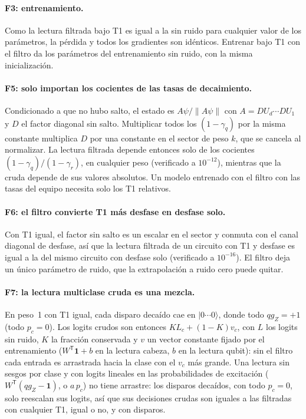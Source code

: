 \documentclass[11pt]{article}
\newcommand{\qZ}{qg_Z}
\begin{document}
\paragraph{F3: entrenamiento.} Como la lectura filtrada bajo T1 es igual a la sin ruido para cualquier valor de
los parámetros, la pérdida y todos los gradientes son idénticos. Entrenar bajo T1 con el filtro da los
parámetros del entrenamiento sin ruido, con la misma inicialización.

\paragraph{F5: solo importan los cocientes de las tasas de decaimiento.} Condicionado a que no hubo salto, el estado
es $A\psi/\|A\psi\|$ con $A=DU_d\cdots DU_1$ y $D$ el factor diagonal sin salto. Multiplicar todos los $(1-\gamma_q)$
por la misma constante multiplica $D$ por una constante en el sector de peso $k$, que se cancela al normalizar. La
lectura filtrada depende entonces solo de los cocientes $(1-\gamma_q)/(1-\gamma_r)$, en cualquier peso (verificado a
$10^{-12}$), mientras que la cruda depende de sus valores absolutos. Un modelo entrenado con el filtro con las tasas
del equipo necesita solo los T1 relativos.

\paragraph{F6: el filtro convierte T1 más desfase en desfase solo.} Con T1 igual, el factor sin salto es un escalar en
el sector y conmuta con el canal diagonal de desfase, así que la lectura filtrada de un circuito con T1 y desfase es
igual a la del mismo circuito con desfase solo (verificado a $10^{-16}$). El filtro deja un único parámetro de ruido,
que la extrapolación a ruido cero puede quitar.

\paragraph{F7: la lectura multiclase cruda es una mezcla.} En peso~1 con T1 igual, cada disparo decaído cae en
$|0\cdots0\rangle$, donde todo $\qZ=+1$ (todo $p_c=0$). Los logits crudos son entonces $K L_c+(1-K)v_c$, con $L$ los
logits sin ruido, $K$ la fracción conservada y $v$ un vector constante fijado por el entrenamiento ($W^{\mathsf T}\mathbf
1+b$ en la lectura cabeza, $b$ en la lectura qubit): sin el filtro cada entrada es arrastrada hacia la clase con el
$v_c$ más grande. Una lectura sin sesgos por clase y con logits lineales en las probabilidades de excitación
($W^{\mathsf T}(\qZ-\mathbf 1)$, o $a\,p_c$) no tiene arrastre: los disparos decaídos, con todo $p_c=0$, solo
reescalan sus logits, así que sus decisiones crudas son iguales a las filtradas con cualquier T1, igual o no, y con
disparos.
\end{document}
